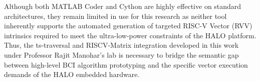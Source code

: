Although both MATLAB Coder and Cython are highly effective on standard architectures, they remain limited in use for this research as neither tool inherently supports the automated generation of targeted RISC-V Vector (RVV) intrinsics required to meet the ultra-low-power constraints of the HALO platform. Thus, the ts-traversal and RISCV-Matrix integration developed in this work under Professor Rajit Manohar's lab is necessary to bridge the semantic gap between high-level BCI algorithm prototyping and the specific vector execution demands of the HALO embedded hardware.


